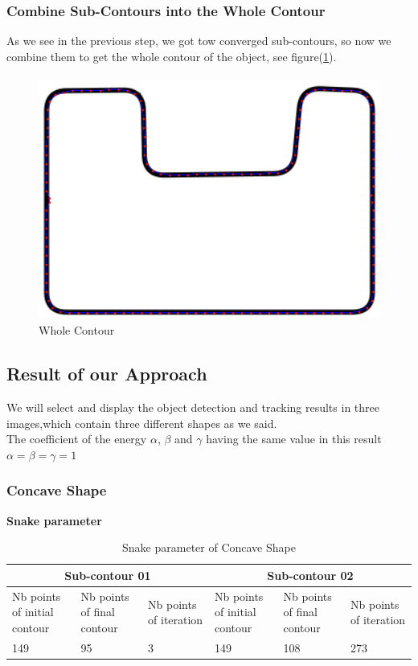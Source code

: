 \subsubsection{Combine Sub-Contours into the Whole Contour}
As we see in the previous step, we got tow converged sub-contours, so now we
combine them to get the whole contour of the object, see figure(\ref{fig:figure3.9}).

\begin{figure}[H]
    \centering
    \includegraphics[width=12cm,height=8cm]{chapiter3/figures/figure 09.png}
    \setlength{\fboxrule}{2pt}
    \caption{Whole Contour}
    \label{fig:figure3.9}
\end{figure}

\subsection{Result of our Approach}\label{subsec:result-of-our-approach}
We will select and display the object detection and tracking results in three
images,which contain three different shapes as we said.\\
The coefficient of the energy $\alpha$, $\beta$ and $\gamma$ having the same value in this result
$\alpha = \beta = \gamma = 1$

\subsubsection{Concave Shape}

\textbf{Snake parameter}

\begin{table}[H]
    \begin{tabular}{ |p{2cm}|p{2cm}|p{2cm}|p{2cm}|p{2cm}|p{2cm}| }
        \hline
        \multicolumn{3}{|c|}{Sub-contour 01} & \multicolumn{3}{|c|}{Sub-contour 02} \\
        \hline
        Nb points of initial contour &
        Nb points of final contour &
        Nb points of iteration &
        Nb points of initial contour &
        Nb points of final contour &
        Nb points of iteration
        \\
        \hline
        149   &  95    &  3 & 149  & 108  & 273 \\

        \hline
    \end{tabular}
    \caption{Snake parameter of Concave Shape}
    \label{tab:table01}
\end{table}


